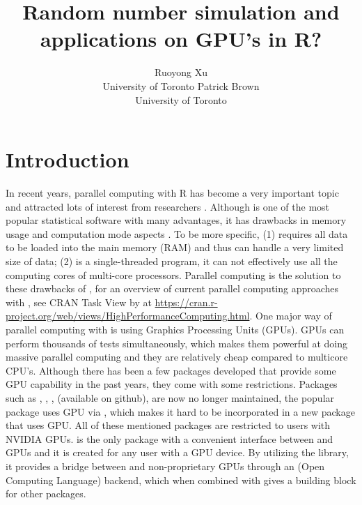 \documentclass[article,nojss]{jss}\usepackage[]{graphicx}\usepackage[]{color}
\author{Ruoyong Xu\\University of Toronto
   \And Patrick Brown\\University of Toronto}
\title{Random number simulation and applications on GPU’s in R?}
\begin{document}




\section[Introduction]{Introduction}

\begin{leftbar}
% 

In recent years, parallel computing with R \citep{r2021} has become a very important topic and attracted lots of interest from researchers \citep[see][for a review]{eddelbuettel2021parallel}. Although  is one of the most popular statistical software with many advantages, it has drawbacks in memory usage and computation mode aspects \citep{zhao_2016}. To be more specific, (1)  requires all data to be loaded into the main memory (RAM) and thus can handle a very limited size of data; (2)  is a single-threaded program, it can not effectively use all the computing cores of multi-core processors. Parallel computing is the solution to these drawbacks of , for an overview of current parallel computing approaches with , see CRAN Task View by \citet{cran2021} at \url{https://cran.r-project.org/web/views/HighPerformanceComputing.html}. One major way of parallel computing with  is using Graphics Processing Units (GPUs). GPUs can perform thousands of tests simultaneously, which makes them powerful at doing massive parallel computing and they are relatively cheap compared to multicore CPU's. Although there has been a few  packages developed that provide some GPU capability in the past years, they come with some restrictions. Packages such as , , ,  (available on github), are now no longer maintained, the popular  \citep{tensorflow1} package uses GPU via , which makes it hard to be incorporated in a new  package that uses GPU. All of these mentioned packages are restricted to  users with NVIDIA GPUs.  \citep{gpur1} is the only  package with a convenient interface between  and GPUs and it is created for any  user with a GPU device. By utilizing the  \citep*{rupp2016viennacl} library, it provides a bridge between  and non-proprietary GPUs through an  (Open Computing Language) backend, which when combined with  \citep{rcpp1} gives a building block for other  packages. 


\end{leftbar}
\end{document}
